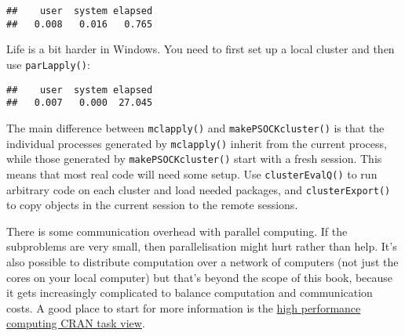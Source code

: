 \begin{verbatim}
##    user  system elapsed 
##   0.008   0.016   0.765
\end{verbatim}

Life is a bit harder in Windows. You need to first set up a local
cluster and then use \texttt{parLapply()}: 

\begin{Shaded}
\begin{Highlighting}[]
\StringTok{ }
\NormalTok{(}\OperatorTok{:}\NormalTok{, }
\end{Highlighting}
\end{Shaded}

\begin{verbatim}
##    user  system elapsed 
##   0.007   0.000  27.045
\end{verbatim}

The main difference between \texttt{mclapply()} and
\texttt{makePSOCKcluster()} is that the individual processes generated
by \texttt{mclapply()} inherit from the current process, while those
generated by \texttt{makePSOCKcluster()} start with a fresh session.
This means that most real code will need some setup. Use
\texttt{clusterEvalQ()} to run arbitrary code on each cluster and load
needed packages, and \texttt{clusterExport()} to copy objects in the
current session to the remote sessions.

\begin{Shaded}
\begin{Highlighting}[]
\StringTok{ }
\StringTok{ }\OperatorTok{::}

\NormalTok{)}
\CommentTok{#> [[1]]}
\end{Highlighting}
\end{Shaded}

There is some communication overhead with parallel computing. If the
subproblems are very small, then parallelisation might hurt rather than
help. It's also possible to distribute computation over a network of
computers (not just the cores on your local computer) but that's beyond
the scope of this book, because it gets increasingly complicated to
balance computation and communication costs. A good place to start for
more information is the
\href{http://cran.r-project.org/web/views/HighPerformanceComputing.html}{high
performance computing CRAN task view}.

